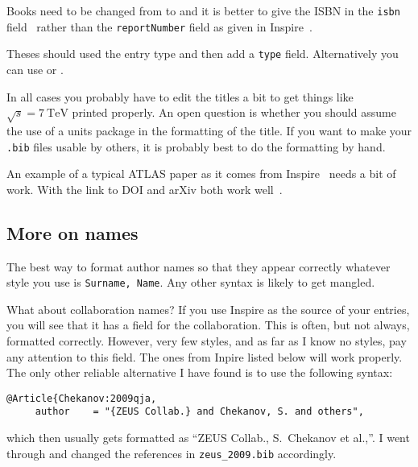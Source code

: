 Books need to be changed from  to
 and it is better to give the ISBN in the \texttt{isbn}
field~\cite{Halzen:1984mc-final} rather than the \texttt{reportNumber}
field as given in Inspire~\cite{Halzen:1984mc-inspire}.

Theses should used the  entry type and
then add a \texttt{type} field. Alternatively you can use
 or .

In all cases you probably have to edit the titles a bit to get
things like $\sqrt{s} = \SI{7}{\TeV}$ printed properly. An open
question is whether you should assume the use of a units package in
the formatting of the title. If you want to make your \texttt{.bib}
files usable by others, it is probably best to do the formatting by
hand.

An example of a typical ATLAS paper as it comes from
Inspire~\cite{Aad:2010ey-inspire} needs a bit of work.  With  the link to DOI and arXiv both work well~\cite{Aad:2010ey-final}.




\subsection{More on names}
\label{sec:ref:names}

The best way to format author names so that they appear correctly
whatever \BibTeX{} style you use is \texttt{Surname, Name}. Any other
syntax is likely to get mangled.

What about collaboration names? If you use Inspire as the source of
your \BibTeX{} entries, you will see that it has a field for the
collaboration. This is often, but not always, formatted
correctly. 
However, very few \BibTeX{} styles, and as far as I know no  styles, 
pay any attention to this field.
The ones from Inpire listed below will work properly. The
only other reliable alternative I have found is to use the following
syntax:
\begin{verbatim}
@Article{Chekanov:2009qja,
     author    = "{ZEUS Collab.} and Chekanov, S. and others",
\end{verbatim}
which then usually gets formatted as \enquote{ZEUS Collab., S.\ Chekanov et
al.,}.
I went through and changed the references in \texttt{zeus\_2009.bib}
accordingly.


